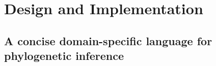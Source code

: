 \documentclass[10pt,letterpaper,table]{article}
\begin{document}





\section*{Design and Implementation}

\subsection*{A concise domain-specific language for phylogenetic inference}
\end{document}
